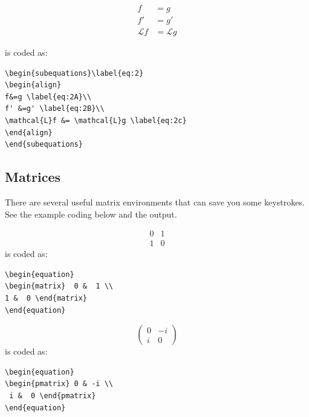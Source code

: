 \documentclass[lettersize,journal]{IEEEtran}
\begin{document}
\begin{subequations}\label{eq:2}
  \begin{align}
    f            & =g \label{eq:2A}             \\
    f'           & =g' \label{eq:2B}            \\
    \mathcal{L}f & = \mathcal{L}g \label{eq:2c}
  \end{align}
\end{subequations}

\noindent is coded as:
\begin{verbatim}
\begin{subequations}\label{eq:2}
\begin{align}
f&=g \label{eq:2A}\\
f' &=g' \label{eq:2B}\\
\mathcal{L}f &= \mathcal{L}g \label{eq:2c}
\end{align}
\end{subequations}

\end{verbatim}

\subsection{Matrices}
\noindent There are several useful matrix environments that can save you some keystrokes. See the example coding below and the output.

\begin{equation}
  \begin{matrix}  0 & 1 \\
                1 & 0\end{matrix}
\end{equation}
is coded as:
\begin{verbatim}
\begin{equation}
\begin{matrix}  0 &  1 \\ 
1 &  0 \end{matrix}
\end{equation}
\end{verbatim}

\begin{equation}
  \begin{pmatrix} 0 & -i \\
                i & 0\end{pmatrix}
\end{equation}
is coded as:
\begin{verbatim}
\begin{equation}
\begin{pmatrix} 0 & -i \\
 i &  0 \end{pmatrix}
\end{equation}
\end{verbatim}
\end{document}
